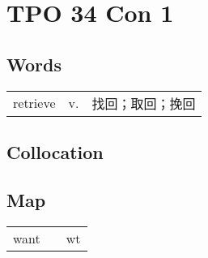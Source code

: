 \section{TPO 34 Con 1}

\subsection{Words}

\begin{tabular}{lll}
    retrieve & v. & 找回；取回；挽回 \\
\end{tabular}

\subsection{Collocation}

\subsection{Map}

\begin{tabular}{rc@{\quad$\to$\quad}l}
    want &  & wt \\
\end{tabular}
